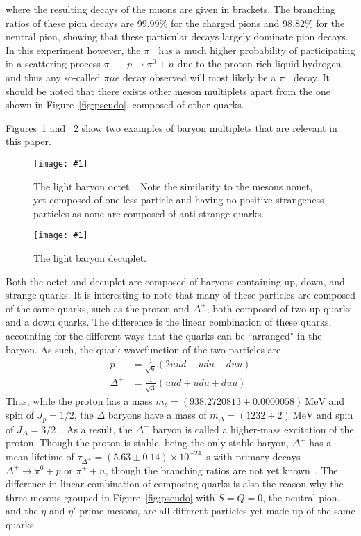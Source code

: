 \documentclass[twocolumn]{article}
\newcommand{\insertFigure}[1]{%
   \texttt{[image: \#1]}%
}
\begin{document}
where the resulting decays of the muons are given in brackets. The branching ratios of these pion decays are 99.99\% for the charged pions and 98.82\% for the neutral pion, showing that these particular decays largely dominate pion decays.~\cite{pdg} In this experiment however, the $\pi^-$ has a much higher probability of participating in a scattering process $\pi^- +p\to \pi^0+n$ due to the proton-rich liquid hydrogen and thus any so-called $\pi \mu e$ decay observed will most likely be a $\pi^+$ decay. It should be noted that there exists other meson multiplets apart from the one shown in Figure~\ref{fig:pseudo}, composed of other quarks.\\

\par Figures~\ref{fig:oct} and ~\ref{fig:dec} show two examples of baryon multiplets that are relevant in this paper.
\begin{figure}[!h]
	\centering
	\insertFigure{oct.png}
	\caption{The light baryon octet.~\cite{oct} Note the similarity to the mesons nonet, yet composed of one less particle and having no positive strangeness particles as none are composed of anti-strange quarks.}
	\label{fig:oct}
\end{figure}
\begin{figure}[!h]
	\centering
	\insertFigure{dec.png}
	\caption{The light baryon decuplet.~\cite{dec}}
	\label{fig:dec}
\end{figure}
Both the octet and decuplet are composed of baryons containing up, down, and strange quarks. It is interesting to note that many of these particles are composed of the same quarks, such as the proton and $\Delta^+$, both composed of two up quarks and a down quarks. The difference is the linear combination of these quarks, accounting for the different ways that the quarks can be ``arranged" in the baryon. As such, the quark wavefunction of the two particles are~\cite{Thompson}
\begin{align*}
p &= \frac {1}{\sqrt{6}} (2uud - udu - duu) \\
\Delta^+ &= \frac {1}{\sqrt{3}} (uud+udu+duu) 
\end{align*}
Thus, while the proton has a mass $m_p = (938.2720813 \pm 0.0000058)~\text{MeV}$ and spin of $J_p=1/2$, the $\Delta$ baryons have a mass of $m_\Delta = (1232 \pm 2)~\text{MeV}$ and spin of $J_\Delta=3/2$~\cite{pdg}. As a result, the $\Delta^+$ baryon is called a higher-mass excitation of the proton. Though the proton is stable, being the only stable baryon, $\Delta^+$ has a mean lifetime of $\tau_{\Delta^+}=(5.63 \pm 0.14) \times 10^{-24}$~s with primary decays $\Delta^+ \to \pi^0+p$ or $\pi^+ + n$, though the branching ratios are not yet known~\cite{pdg}. The difference in linear combination of composing quarks is also the reason why the three mesons grouped in Figure~\ref{fig:pseudo} with $S = Q = 0$, the neutral pion, and the $\eta$ and $\eta'$ prime mesons, are all different particles yet made up of the same quarks.
\end{document}
